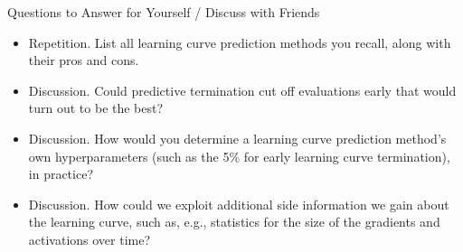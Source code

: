 
\begin{frame}[c]{Questions to Answer for Yourself / Discuss with Friends}

\begin{itemize}
    \item \alert{Repetition.} List all learning curve prediction methods you recall, along with their pros and cons.
\medskip
    \item \alert{Discussion.} Could predictive termination cut off evaluations early that would turn out to be the best?
\medskip
    \item \alert{Discussion.} How would you determine a learning curve prediction method's own hyperparameters (such as the 5\% for early learning curve termination), in practice?
\medskip
    \item \alert{Discussion.} How could we exploit additional side information we gain about the learning curve, such as, e.g., statistics for the size of the gradients and activations over time?
\end{itemize}

\end{frame}